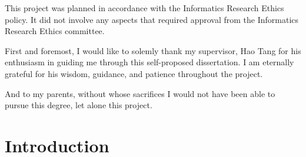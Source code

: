 \documentclass[logo,bsc,singlespacing,parskip,online]{infthesis}
\begin{document}
\begin{preliminary}
\begin{ethics}
This project was planned in accordance with the Informatics Research
Ethics policy. It did not involve any aspects that required approval
from the Informatics Research Ethics committee.

\standarddeclaration
\end{ethics}


\begin{acknowledgements}
First and foremost, I would like to solemly thank my supervisor, Hao Tang for 
his enthusiasm in guiding me through this self-proposed dissertation. I am eternally grateful for his wisdom, guidance, and patience throughout the project.

And to my parents, without whose sacrifices I would not have been able to pursue this degree, let alone this project.
\end{acknowledgements}


\tableofcontents
\end{preliminary}


\chapter{Introduction}
\end{document}
